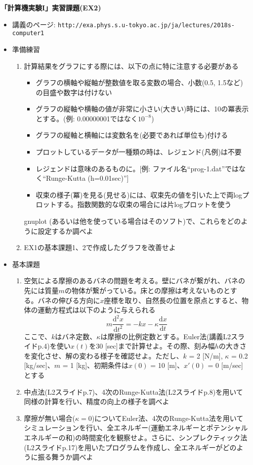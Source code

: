 \documentclass[11pt]{jarticle}
\begin{document}
\noindent
{\bf\large 「計算機実験I」実習課題(EX2)}
\\[-0.5em]

\noindent
\begin{itemize}
\item 講義のページ: \verb+http://exa.phys.s.u-tokyo.ac.jp/ja/lectures/2018s-computer1+

\item 準備練習
  \begin{enumerate}
  \item 計算結果をグラフにする際には、以下の点に特に注意する必要がある
    \begin{itemize}
    \item グラフの横軸や縦軸が整数値を取る変数の場合、小数(0.5, 1.5など)の目盛や数字は付けない
    \item グラフの縦軸や横軸の値が非常に小さい(大きい)時には、10の冪表示とする。(例: 0.00000001ではなく$10^{-8}$)
    \item グラフの縦軸と横軸には変数名を(必要であれば単位も)付ける
    \item プロットしているデータが一種類の時は、レジェンド(凡例)は不要
    \item レジェンドは意味のあるものに。[例: ファイル名``prog-1.dat''ではなく``Runge-Kutta (h=0.01sec)'']
    \item 収束の様子(冪)を見る(見せる)には、収束先の値を引いた上で両logプロットする。指数関数的な収束の場合には片logプロットを使う
    \end{itemize}
    gnuplot (あるいは他を使っている場合はそのソフト)で、これらをどのように設定するか調べよ
  \item EX1の基本課題1、2で作成したグラフを改善せよ
  \end{enumerate}

\item 基本課題
  \begin{enumerate}
  \item 空気による摩擦のあるバネの問題を考える。壁にバネが繋がれ、バネの先には質量$m$の物体が繋がっている。床との摩擦は考えないものとする。バネの伸びる方向に$x$座標を取り、自然長の位置を原点とすると、物体の運動方程式は以下のように与えられる
    \[
    m\frac{\mathrm{d} ^2x}{\mathrm{d} t^2} = -kx - \kappa \frac{\mathrm{d} x}{\mathrm{d} t} 
    \]
    ここで、$k$はバネ定数、$\kappa$は摩擦の比例定数とする。Euler法(講義L2スライドp.4)を使い$x(t)$を30 [sec]まで計算せよ。その際、刻み幅$h$の大きさを変化させ、解の変わる様子を確認せよ。ただし、$k$ = 2 [N/m], $\kappa$ = 0.2 [kg/sec]、$m$ = 1 [kg]、初期条件は$x(0)$ = 10 [m]、$x'(0)$ = 0 [m/sec] とする
  \item 中点法(L2スライドp.7)、4次のRunge-Kutta法(L2スライドp.8)を用いて同様の計算を行い、精度の向上の様子を調べよ
  \item 摩擦が無い場合($\kappa=0$)についてEuler法、4次のRunge-Kutta法を用いてシミュレーションを行い、全エネルギー(運動エネルギーとポテンシャルエネルギーの和)の時間変化を観察せよ。さらに、シンプレクティック法(L2スライドp.17)を用いたプログラムを作成し、全エネルギーがどのように振る舞うか調べよ
  \end{enumerate}
  

\end{itemize}
\end{document}
